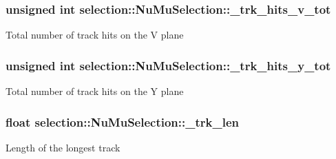 \subsubsection[{\texorpdfstring{\+\_\+trk\+\_\+hits\+\_\+v\+\_\+tot}{_trk_hits_v_tot}}]{\setlength{\rightskip}{0pt plus 5cm}unsigned int selection\+::\+Nu\+Mu\+Selection\+::\+\_\+trk\+\_\+hits\+\_\+v\+\_\+tot\hspace{0.3cm}{\ttfamily [private]}}\hypertarget{classselection_1_1NuMuSelection_adf551288be333a585b4fe8b111b8d3dc}{}\label{classselection_1_1NuMuSelection_adf551288be333a585b4fe8b111b8d3dc}
Total number of track hits on the V plane 
\subsubsection[{\texorpdfstring{\+\_\+trk\+\_\+hits\+\_\+y\+\_\+tot}{_trk_hits_y_tot}}]{\setlength{\rightskip}{0pt plus 5cm}unsigned int selection\+::\+Nu\+Mu\+Selection\+::\+\_\+trk\+\_\+hits\+\_\+y\+\_\+tot\hspace{0.3cm}{\ttfamily [private]}}\hypertarget{classselection_1_1NuMuSelection_a7c0ae4ea16390adf8803846578ad2d05}{}\label{classselection_1_1NuMuSelection_a7c0ae4ea16390adf8803846578ad2d05}
Total number of track hits on the Y plane 
\subsubsection[{\texorpdfstring{\+\_\+trk\+\_\+len}{_trk_len}}]{\setlength{\rightskip}{0pt plus 5cm}float selection\+::\+Nu\+Mu\+Selection\+::\+\_\+trk\+\_\+len\hspace{0.3cm}{\ttfamily [private]}}\hypertarget{classselection_1_1NuMuSelection_ab8df38bd822646f56b672b4f942930a3}{}\label{classselection_1_1NuMuSelection_ab8df38bd822646f56b672b4f942930a3}
Length of the longest track 
